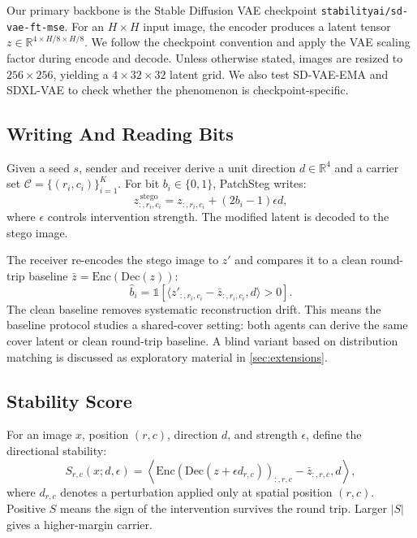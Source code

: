 \documentclass{article}
\begin{document}
Our primary backbone is the Stable Diffusion VAE checkpoint \texttt{stabilityai/sd-vae-ft-mse}. For an $H\times H$ input image, the encoder produces a latent tensor $z\in\mathbb{R}^{4\times H/8\times H/8}$. We follow the checkpoint convention and apply the VAE scaling factor during encode and decode. Unless otherwise stated, images are resized to $256\times256$, yielding a $4\times32\times32$ latent grid. We also test SD-VAE-EMA and SDXL-VAE to check whether the phenomenon is checkpoint-specific.

\subsection{Writing And Reading Bits}

Given a seed $s$, sender and receiver derive a unit direction $d\in\mathbb{R}^4$ and a carrier set $\mathcal{C}=\{(r_i,c_i)\}_{i=1}^K$. For bit $b_i\in\{0,1\}$, PatchSteg writes:
\begin{equation}
    z_{:,r_i,c_i}^{\,\mathrm{stego}}
    =
    z_{:,r_i,c_i}
    +
    (2b_i-1)\epsilon d ,
\end{equation}
where $\epsilon$ controls intervention strength. The modified latent is decoded to the stego image.

The receiver re-encodes the stego image to $z'$ and compares it to a clean round-trip baseline $\bar z=\mathrm{Enc}(\mathrm{Dec}(z))$:
\begin{equation}
    \hat b_i =
    \mathbb{1}\left[
    \langle z'_{:,r_i,c_i}-\bar z_{:,r_i,c_i}, d\rangle > 0
    \right].
\end{equation}
The clean baseline removes systematic reconstruction drift. This means the baseline protocol studies a shared-cover setting: both agents can derive the same cover latent or clean round-trip baseline. A blind variant based on distribution matching is discussed as exploratory material in \cref{sec:extensions}.

\subsection{Stability Score}

For an image $x$, position $(r,c)$, direction $d$, and strength $\epsilon$, define the directional stability:
\begin{equation}
\label{eq:stability}
S_{r,c}(x;d,\epsilon)
=
\left\langle
\mathrm{Enc}(\mathrm{Dec}(z+\epsilon d_{r,c}))_{:,r,c}
-
\bar z_{:,r,c},
d
\right\rangle ,
\end{equation}
where $d_{r,c}$ denotes a perturbation applied only at spatial position $(r,c)$. Positive $S$ means the sign of the intervention survives the round trip. Larger $|S|$ gives a higher-margin carrier.
\end{document}
